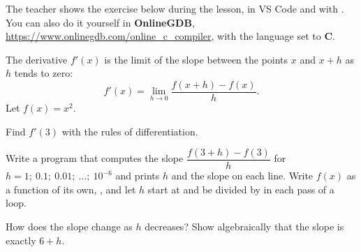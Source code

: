 The teacher shows the exercise below during the lesson, in VS Code and with . You can
also do it yourself in \textbf{OnlineGDB}, \url{https://www.onlinegdb.com/online_c_compiler}, with
the language set to \textbf{C}.

The derivative $f'(x)$ is the limit of the slope between the points $x$ and $x + h$ as $h$ tends
to zero:
\[
  f'(x) = \lim_{h \to 0} \frac{f(x + h) - f(x)}{h}.
\]
Let $f(x) = x^2$.
\begin{parts}
  \item Find $f'(3)$ with the rules of differentiation.
  \item Write a program that computes the slope $\dfrac{f(3 + h) - f(3)}{h}$ for
    $h = 1;\ 0.1;\ 0.01;\ \ldots;\ 10^{-6}$ and prints $h$ and the slope on each line. Write $f(x)$
    as a function of its own, , and let $h$ start at  and be
    divided by  in each pass of a loop.
  \item How does the slope change as $h$ decreases? Show algebraically that the slope is exactly
    $6 + h$.
\end{parts}
